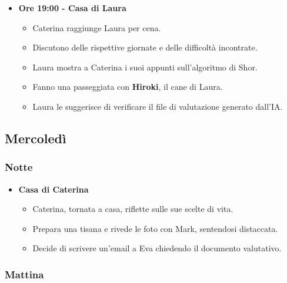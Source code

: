 \begin{itemize}
    \item \textbf{Ore 19:00 - Casa di Laura}
    \begin{itemize}
        \item Caterina raggiunge Laura per cena.
        \item Discutono delle rispettive giornate e delle difficoltà incontrate.
        \item Laura mostra a Caterina i suoi appunti sull'algoritmo di Shor.
        \item Fanno una passeggiata con \textbf{Hiroki}, il cane di Laura.
        \item Laura le suggerisce di verificare il file di valutazione generato dall'IA.
    \end{itemize}
\end{itemize}

\subsection*{Mercoledì}

\subsubsection*{Notte}

\begin{itemize}
    \item \textbf{Casa di Caterina}
    \begin{itemize}
        \item Caterina, tornata a casa, riflette sulle sue scelte di vita.
        \item Prepara una tisana e rivede le foto con Mark, sentendosi distaccata.
        \item Decide di scrivere un'email a Eva chiedendo il documento valutativo.
    \end{itemize}
\end{itemize}

\subsubsection*{Mattina}

